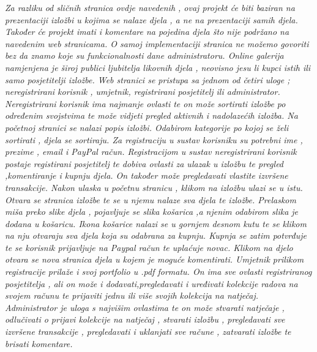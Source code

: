 		
		\textit{Za razliku od sličnih stranica ovdje navedenih , ovaj projekt će biti baziran na prezentaciji izložbi u kojima se nalaze djela , a ne na prezentaciji samih djela. Također će projekt 				imati i komentare na pojedina djela što nije podržano na navedenim web stranicama. O samoj implementaciji stranica ne možemo govoriti bez da znamo koje su funkcionalnosti 				dane administratoru.
			Online galerija namjenjena je široj publici ljubitelja likovnih djela , neovisno jesu li kupci istih ili samo posjetitelji izložbe. 
			Web stranici se pristupa sa jednom od četiri uloge ; neregistrirani korisnik , umjetnik, registrirani posjetitelj ili administrator. Neregistrirani korisnik ima najmanje ovlasti te on može 				sortirati izložbe po određenim svojstvima te može vidjeti pregled aktivnih i nadolazećih izložba. 
			Na početnoj stranici se nalazi popis izložbi. Odabirom kategorije po kojoj se želi sortirati , djela se sortiraju.
			Za registraciju u sustav korisniku su potrebni ime , prezime , email i PayPal račun.
			Registracijom u sustav neregistrirani korisnik postaje registirani posjetitelj te dobiva ovlasti za ulazak u izložbu te pregled ,komentiranje i kupnju djela. On također može 					pregledavati vlastite izvršene transakcije.
			Nakon ulaska u početnu stranicu , klikom na izložbu ulazi se u istu. Otvara se stranica izložbe te se u njemu nalaze sva djela te izložbe.
			Prelaskom miša preko slike djela , pojavljuje se slika košarica ,a njenim odabirom slika je dodana u košaricu. Ikona košarice nalazi se u gornjem desnom kutu te se klikom na nju 				otvaraju sva djela koja su odabrana za kupnju. Kupnja se zatim potvrđuje te se korisnik prijavljuje na Paypal račun te uplaćuje novac. 
			Klikom na djelo otvara se nova stranica djela u kojem je moguće komentirati. 
			Umjetnik prilikom registracije prilaže i svoj portfolio u .pdf formatu. On ima sve ovlasti registriranog posjetitelja , ali on može i dodavati,pregledavati i uređivati kolekcije radova na 				svojem računu te prijaviti jednu ili više svojih kolekcija na natječaj.
			Administrator je uloga s najvišim ovlastima te on može stvarati natječaje , odlučivati o prijavi kolekcije na natječaj , stvarati izložbu , pregledavati sve izvršene transakcije , 					pregledavati i uklanjati sve račune , zatvarati izložbe te brisati komentare.
}
		
		

